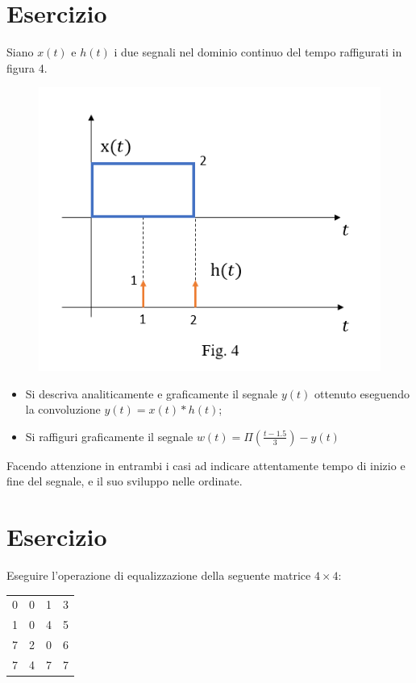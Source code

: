 \documentclass[a4paper]{article}
\begin{document}
	\section{Esercizio}
	
	Siano $x\left(t\right)$ e $h\left(t\right)$ i due segnali nel dominio continuo del tempo raffigurati in figura 4.
	\begin{figure}[!htp]
		\centering
		\includegraphics[width=.7\textwidth]{img/fig_4.png}
	\end{figure}
	
	\begin{itemize}
		\item Si descriva analiticamente e graficamente il segnale $y\left(t\right)$ ottenuto eseguendo la convoluzione $y\left(t\right) = x\left(t\right) * h\left(t\right)$;

		\item Si raffiguri graficamente il segnale $w\left(t\right) = \Pi\left(\frac{t - 1.5}{3}\right) - y\left(t\right)$
	\end{itemize}
	Facendo attenzione in entrambi i casi ad indicare attentamente tempo di inizio e fine del segnale, e il suo sviluppo nelle ordinate.
	
	\section{Esercizio}
	
	Eseguire l'operazione di equalizzazione della seguente matrice $4 \times 4$:
	\begin{table}[!htbp]
		\centering
		\begin{tabular}{@{} c | c | c | c @{}}
			\toprule
			0 & 0 & 1 & 3 \\
			1 & 0 & 4 & 5 \\
			7 & 2 & 0 & 6 \\
			7 & 4 & 7 & 7 \\
			\bottomrule
		\end{tabular}
	\end{table}
\end{document}
